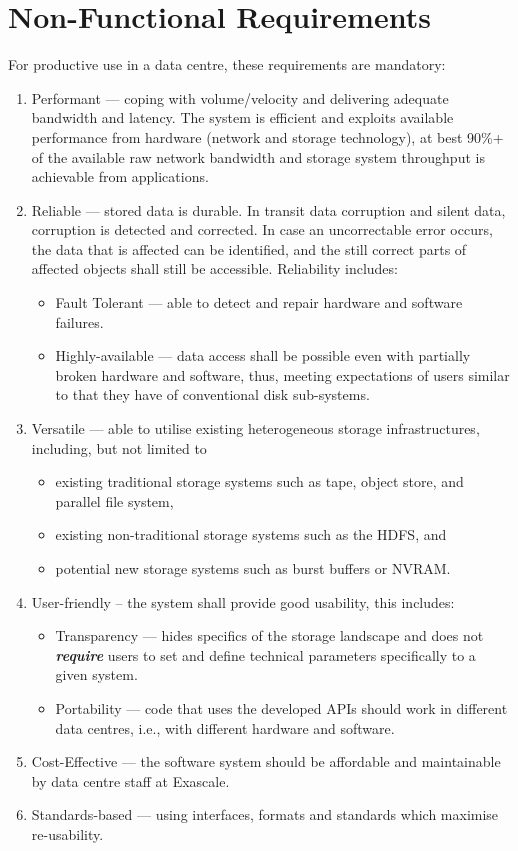 \section{Non-Functional Requirements}
\label{sec: requirements/non functional}


For productive use in a data centre, these requirements are mandatory:
\begin{enumerate}
\item Performant --- coping with volume/velocity and delivering adequate bandwidth and latency. The system is efficient and exploits available performance from hardware (network and storage technology), at best 90\%+ of the available raw network bandwidth and storage system throughput is achievable from applications.
\item Reliable --- stored data is durable. In transit data corruption and silent data, corruption is detected and corrected. In case an uncorrectable error occurs, the data that is affected can be identified, and the still correct parts of affected objects shall still be accessible. Reliability includes:
  \begin{itemize}
  \item Fault Tolerant --- able to detect and repair hardware and software failures.
  \item Highly-available --- data access shall be possible even with partially broken hardware and software, thus, meeting expectations of users similar to that they have of conventional disk sub-systems.
  \end{itemize}
\item Versatile ---  able to utilise existing heterogeneous storage infrastructures, including, but not limited to
  \begin{itemize}
  \item existing traditional storage systems such as tape, object store, and parallel file system,
  \item existing non-traditional storage systems such as the HDFS, and
  \item potential new storage systems such as burst buffers or NVRAM.
  \end{itemize}
\item User-friendly -- the system shall provide good usability, this includes:
  \begin{itemize}
  \item Transparency --- hides specifics of the storage landscape and does not \textit{\textbf{require}} users to set and define technical parameters specifically to a given system.
  \item Portability --- code that uses the developed APIs should work in different data centres, i.e., with different hardware and software.
  \end{itemize}
\item Cost-Effective --- the software system should be affordable and maintainable by data centre staff at Exascale.

\item Standards-based --- using interfaces, formats and standards which maximise re-usability.
\end{enumerate}

